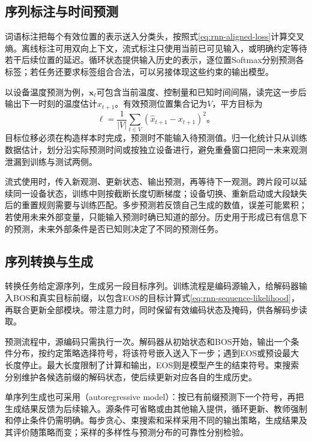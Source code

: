 \subsection{序列标注与时间预测}
\label{sec:rnn-application-aligned}

词语标注把每个有效位置的表示送入分类头，按照式\eqref{eq:rnn-aligned-loss}计算交叉熵。离线标注可用双向上下文，流式标注只使用当前已可见输入，或明确约定等待若干后续位置的延迟。循环状态提供输入历史的表示，逐位置Softmax分别预测各标签；若任务还要求标签组合合法，可以另接体现这些约束的输出模型。

以设备温度预测为例，$\bm{x}_t$可包含当前温度、控制量和已知时间间隔，读完这一步后输出下一时刻的温度估计$\widehat x_{t+1}$。有效预测位置集合记为$V$，平方目标为
\begin{equation}
  \ell=\frac{1}{|V|}\sum_{t\in V}
      (\widehat x_{t+1}-x_{t+1})^2\text{。}
  \label{eq:rnn-forecast-loss}
\end{equation}
目标位移必须在构造样本时完成，预测时不能输入待预测值。归一化统计只从训练数据估计，划分沿实际预测时间或按独立设备进行，避免重叠窗口把同一未来观测泄漏到训练与测试两侧。

流式使用时，传入新观测、更新状态、输出预测，再等待下一观测。跨片段可以延续同一设备状态，训练中则按截断长度切断梯度；设备切换、重新启动或大段缺失后的重置规则需要与训练匹配。多步预测若反馈自己生成的数值，误差可能累积；若使用未来外部变量，只能输入预测时确已知道的部分。历史用于形成已有信息下的预测，未来外部条件是否已知则决定了不同的预测任务。

\subsection{序列转换与生成}
\label{sec:rnn-application-generation}

转换任务给定源序列，生成另一段目标序列。训练流程是编码源输入，给解码器输入BOS和真实目标前缀，以包含EOS的目标计算式\eqref{eq:rnn-sequence-likelihood}，再联合更新全部模块。带注意力时，同时保留有效编码状态及掩码，供各解码步读取。

预测流程中，源编码只需执行一次。解码器从初始状态和BOS开始，输出一个条件分布，按约定策略选择符号，将该符号嵌入送入下一步；遇到EOS或预设最大长度停止。最大长度限制了计算和输出，EOS则是模型产生的结束符号。束搜索分别维护各候选前缀的解码状态，使后续更新对应各自的生成历史。

单序列生成也可采用（autoregressive model）：按已有前缀预测下一个符号，再把生成结果反馈为后续输入。源条件可省略或由其他输入提供，循环更新、教师强制和停止条件仍需明确。每步贪心、束搜索和采样采用不同的输出策略，生成结果及其评价随策略而变；采样的多样性与预测分布的可靠性分别检验。


